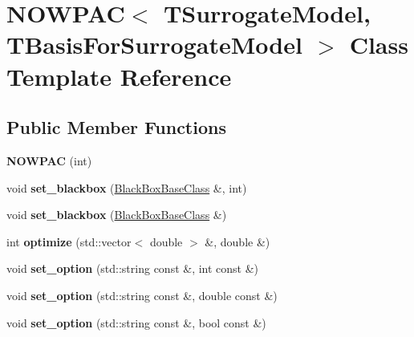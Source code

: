 \hypertarget{class_n_o_w_p_a_c}{}\section{N\+O\+W\+P\+AC$<$ T\+Surrogate\+Model, T\+Basis\+For\+Surrogate\+Model $>$ Class Template Reference}
\label{class_n_o_w_p_a_c}
\subsection*{Public Member Functions}
\begin{DoxyCompactItemize}
\item 
{\bfseries N\+O\+W\+P\+AC} (int)\hypertarget{class_n_o_w_p_a_c_af9ec4bd7b20d402fa392869119bf1f38}{}\label{class_n_o_w_p_a_c_af9ec4bd7b20d402fa392869119bf1f38}

\item 
void {\bfseries set\+\_\+blackbox} (\hyperlink{class_black_box_base_class}{Black\+Box\+Base\+Class} \&, int)\hypertarget{class_n_o_w_p_a_c_aedb0e94399391d20972af7bc09347863}{}\label{class_n_o_w_p_a_c_aedb0e94399391d20972af7bc09347863}

\item 
void {\bfseries set\+\_\+blackbox} (\hyperlink{class_black_box_base_class}{Black\+Box\+Base\+Class} \&)\hypertarget{class_n_o_w_p_a_c_af0a6067309cebafcbb837a7c8ff123e8}{}\label{class_n_o_w_p_a_c_af0a6067309cebafcbb837a7c8ff123e8}

\item 
int {\bfseries optimize} (std\+::vector$<$ double $>$ \&, double \&)\hypertarget{class_n_o_w_p_a_c_a8aa394691bff1b6a7b6be7c6ed7a9fdf}{}\label{class_n_o_w_p_a_c_a8aa394691bff1b6a7b6be7c6ed7a9fdf}

\item 
void {\bfseries set\+\_\+option} (std\+::string const \&, int const \&)\hypertarget{class_n_o_w_p_a_c_a89f9e79becf6ce73bed9653545b4bd7c}{}\label{class_n_o_w_p_a_c_a89f9e79becf6ce73bed9653545b4bd7c}

\item 
void {\bfseries set\+\_\+option} (std\+::string const \&, double const \&)\hypertarget{class_n_o_w_p_a_c_a71adaa4821b319d8979708d67ceea491}{}\label{class_n_o_w_p_a_c_a71adaa4821b319d8979708d67ceea491}

\item 
void {\bfseries set\+\_\+option} (std\+::string const \&, bool const \&)\hypertarget{class_n_o_w_p_a_c_ad5730a6bc607f01ad374728bac662457}{}\label{class_n_o_w_p_a_c_ad5730a6bc607f01ad374728bac662457}


\end{DoxyCompactItemize}
